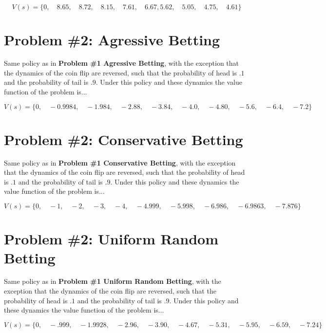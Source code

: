 \documentclass[12pt]{article}
\begin{document}
$$
V(s) = \big\{ 0, \quad 8.65, \quad 8.72, \quad 8.15, \quad 7.61, \quad 6.67,  5.62, \quad 5.05, \quad 4.75, \quad 4.61 \big\}
$$


\section*{Problem \#2: Agressive Betting}

Same policy as in \textbf{Problem \#1 Agressive Betting}, with the exception that the dynamics of the coin flip are reversed, such that the probability of head is $.1$ and the probability of tail is $.9$. Under this policy and these dynamics the value function of the problem is...


$$
V(s) = \big\{ 0, \quad -0.9984, \quad -1.984, \quad -2.88, \quad -3.84, \quad -4.0,\quad  -4.80, \quad -5.6, \quad -6.4, \quad -7.2 \big\}
$$

\section*{Problem \#2: Conservative Betting}

Same policy as in \textbf{Problem \#1 Conservative Betting}, with the exception that the dynamics of the coin flip are reversed, such that the probability of head is $.1$ and the probability of tail is $.9$. Under this policy and these dynamics the value function of the problem is...

$$
V(s) = \big\{ 0, \quad -1, \quad -2, \quad -3, \quad -4, \quad -4.999,\quad  -5.998, \quad -6.986, \quad -6.9863, \quad -7.876 \big\}
$$


\section*{Problem \#2: Uniform Random Betting}

Same policy as in \textbf{Problem \#1 Uniform Random Betting}, with the exception that the dynamics of the coin flip are reversed, such that the probability of head is $.1$ and the probability of tail is $.9$. Under this policy and these dynamics the value function of the problem is...


$$
V(s) = \big\{ 0, \quad -.999, \quad -1.9928, \quad -2.96, \quad -3.90, \quad -4.67,\quad -5.31, \quad -5.95, \quad -6.59, \quad -7.24 \big\}
$$
\end{document}
